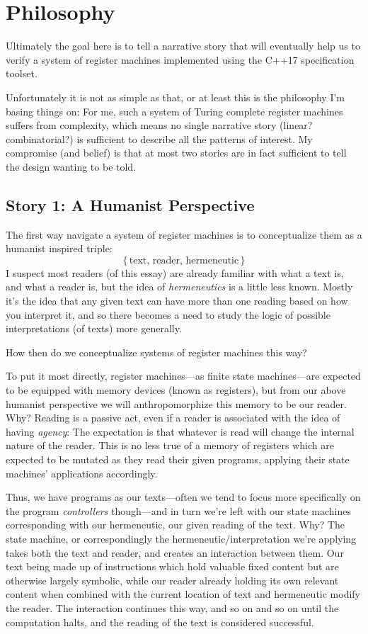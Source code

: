 \documentclass[twoside]{article}
\begin{document}
\section*{Philosophy}

Ultimately the goal here is to tell a narrative story that will eventually help us to verify a system of register
machines implemented using the C++17 specification toolset.

Unfortunately it is not as simple as that, or at least this is the philosophy I'm basing things on: For me,
such a system of Turing complete register machines suffers from complexity, which means no single narrative
story (linear?  combinatorial?) is sufficient to describe all the patterns of interest. My compromise
(and belief) is that at most two stories are in fact sufficient to tell the design wanting to be told.

\subsection*{Story 1: A Humanist Perspective}

The first way navigate a system of register machines is to conceptualize them as a humanist inspired triple:
$$ \{\,\mbox{text, reader, hermeneutic}\,\} $$
I suspect most readers (of this essay) are already familiar with what a text is, and what a reader is, but
the idea of \emph{hermeneutics} is a little less known. Mostly it's the idea that any given text can have
more than one reading based on how you interpret it, and so there becomes a need to study the logic of
possible interpretations (of texts) more generally.

How then do we conceptualize systems of register machines this way?

To put it most directly, register machines---as finite state machines---are expected to be equipped with
memory devices (known as registers), but from our above humanist perspective we will anthropomorphize this
memory to be our reader. Why? Reading is a passive act, even if a reader is associated with the idea of
having \emph{agency}: The expectation is that whatever is read will change the internal nature of the reader.
This is no less true of a memory of registers which are expected to be mutated as they read their given programs,
applying their state machines' applications accordingly.

Thus, we have programs as our texts---often we tend to focus more specifically on the program \emph{controllers}
though---and in turn we're left with our state machines corresponding with our hermeneutic, our given reading of
the text. Why? The state machine, or correspondingly the hermeneutic/interpretation we're applying takes both
the text and reader, and creates an interaction between them. Our text being made up of instructions which hold
valuable fixed content but are otherwise largely symbolic, while our reader already holding its own relevant content
when combined with the current location of text and hermeneutic modify the reader. The interaction continues this
way, and so on and so on until the computation halts, and the reading of the text is considered successful.
\end{document}
